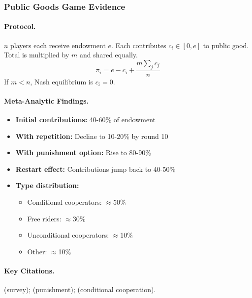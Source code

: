 
\subsubsection{Public Goods Game Evidence}

\paragraph{Protocol.}
$n$ players each receive endowment $e$. Each contributes $c_i \in [0, e]$
to public good. Total is multiplied by $m$ and shared equally.
\begin{equation}
\pi_i = e - c_i + \frac{m \sum_j c_j}{n}
\end{equation}
If $m < n$, Nash equilibrium is $c_i = 0$.

\paragraph{Meta-Analytic Findings.}
\begin{itemize}[nosep]
    \item \textbf{Initial contributions:} 40-60\% of endowment
    \item \textbf{With repetition:} Decline to 10-20\% by round 10
    \item \textbf{With punishment option:} Rise to 80-90\%
    \item \textbf{Restart effect:} Contributions jump back to 40-50\%
    \item \textbf{Type distribution:}
    \begin{itemize}[nosep]
        \item Conditional cooperators: $\approx$50\%
        \item Free riders: $\approx$30\%
        \item Unconditional cooperators: $\approx$10\%
        \item Other: $\approx$10\%
    \end{itemize}
\end{itemize}

\paragraph{Key Citations.}
\citet{ledyard1995} (survey); \citet{fehrgaechter2000} (punishment);
\citet{fischbacher2001} (conditional cooperation).

